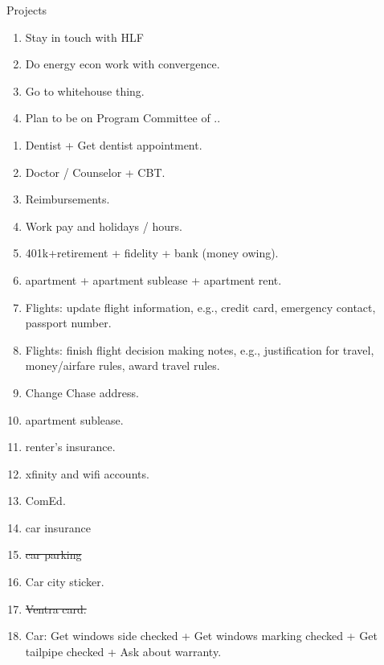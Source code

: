 \documentclass[serif, mathserif, final]{beamer}
\newcommand{\doneTask}[1]{\tiny \item \tiny \sout{#1}}
\begin{document}
\begin{frame}
\begin{columns}
\begin{column}{0.5\textwidth}
\begin{block}{Projects}
\begin{enumerate}
\item \tiny Stay in touch with HLF 
\item \tiny Do energy econ work with convergence. 
\item \tiny Go to whitehouse thing. 
\item \tiny Plan to be on Program Committee of .. 
\end{enumerate}
\begin{enumerate}
\tiny \item \tiny Dentist + Get dentist appointment.
\item \tiny Doctor / Counselor + CBT.
\item \tiny Reimbursements.
\item \tiny Work pay and holidays / hours. 
\item \tiny 401k+retirement  + fidelity + bank (money owing). 
\item \tiny apartment + apartment sublease + apartment rent.
\item \tiny Flights: update flight information, e.g., credit card,
  emergency contact, passport number.
\item \tiny Flights: finish flight decision making notes, e.g.,
  justification for travel, money/airfare rules, award travel rules.
\item \tiny Change Chase address. 
\item \tiny apartment sublease. 
\item \tiny renter's insurance. 
\item \tiny xfinity and wifi accounts. 
\item \tiny ComEd. 
\item \tiny car insurance \doneTask{car parking} 
\item \tiny Car city sticker. \doneTask{Ventra card.}
\item \tiny Car: Get windows side checked + Get windows marking checked + Get tailpipe checked + Ask about warranty. 
\end{enumerate}


\end{block}
\end{column}
\end{columns}
\end{frame}
\end{document}
